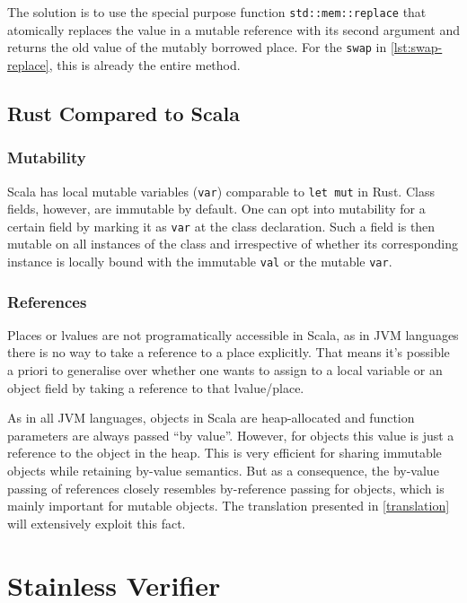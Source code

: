 The solution is to use the special purpose function
\lstinline!std::mem::replace! that atomically replaces the value in a mutable
reference with its second argument and returns the old value of the mutably
borrowed place. For the \lstinline!swap! in \autoref{lst:swap-replace}, this is
already the entire method.


\subsection{Rust Compared to Scala}

\subsubsection{Mutability}

Scala has local mutable variables (\lstinline!var!) comparable to
\passthrough{\lstinline!let mut!} in Rust. Class fields, however, are immutable
by default. One can opt into mutability for a certain field by marking it as
\lstinline!var! at the class declaration. Such a field is then mutable on all
instances of the class and irrespective of whether its corresponding instance is
locally bound with the immutable \lstinline!val! or the mutable \lstinline!var!.

\subsubsection{References}

Places or lvalues are not programatically accessible in Scala, as in JVM
languages there is no way to take a reference to a place explicitly. That means
it's possible a priori to generalise over whether one wants to assign to a local
variable or an object field by taking a reference to that lvalue/place.

As in all JVM languages, objects in Scala are heap-allocated and function
parameters are always passed ``by value''. However, for objects this value is
just a reference to the object in the heap. This is very efficient for sharing
immutable objects while retaining by-value semantics. But as a consequence, the
by-value passing of references closely resembles by-reference passing for
objects, which is mainly important for mutable objects. The translation
presented in \autoref{translation} will extensively exploit this fact.


\section{Stainless Verifier}

